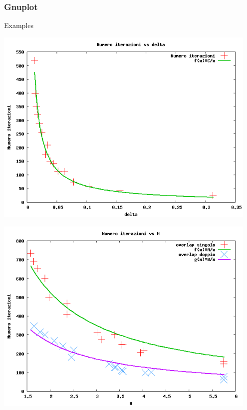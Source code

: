 \documentclass{beamer}
\begin{document}
\begin{frame}

    \frametitle{Gnuplot}

    \begin{block}{Examples}

        \centering
    
        \begin{minipage}{0.5\textwidth}
            \centering
            \includegraphics[width=0.95\textwidth]{images/iter_vs_delta}
        \end{minipage}%
        \begin{minipage}{0.5\textwidth}
            \centering
            \includegraphics[width=0.95\textwidth]{images/iter_vs_H}
        \end{minipage}

    \end{block}

\end{frame}
\end{document}

